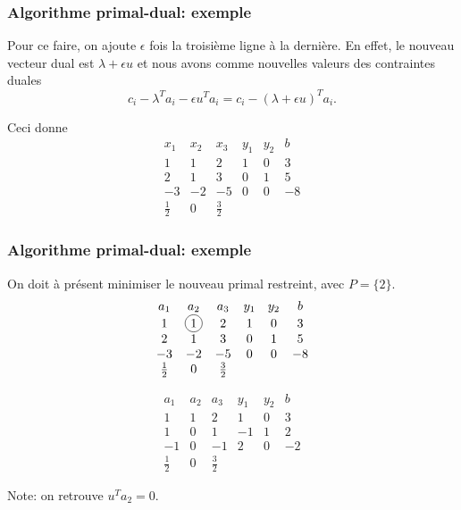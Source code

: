 \documentclass[t,usepdftitle=false]{beamer}
\newcommand*\circled[1]{\tikz[baseline=(char.base)]{
    \node[shape=circle,draw,inner sep=2pt] (char) {#1};}}
\begin{document}
\begin{frame}
\frametitle{Algorithme primal-dual: exemple}

Pour ce faire, on ajoute $\epsilon$ fois la troisième ligne à la dernière.
En effet, le nouveau vecteur dual est $\lambda+\epsilon u$ et nous avons comme nouvelles valeurs des contraintes duales
$$
c_i - \lambda^T a_i - \epsilon u^T a_i = c_i - (\lambda + \epsilon u)^Ta_i. 
$$

\mbox{}

Ceci donne
$$
\begin{matrix}
x_1 & x_2 & x_3 & y_1 & y_2 & b \\
1 & 1 & 2 & 1 & 0 & 3 \\
2 & 1 & 3 & 0 & 1 & 5 \\
-3 & -2 & -5 & 0 & 0 & -8 \\
\frac{1}{2} & 0 & \frac{3}{2}
\end{matrix}
$$

\end{frame}

\begin{frame}
\frametitle{Algorithme primal-dual: exemple}

On doit à présent minimiser le nouveau primal restreint, avec $P = \lbrace 2 \rbrace$.
\[
\begin{matrix}
a_1 & a_2 & a_3 & y_1 & y_2 & b \\
1 & \circled{1} & 2 & 1 & 0 & 3 \\
2 & 1 & 3 & 0 & 1 & 5 \\
-3 & -2 & -5 & 0 & 0 & -8 \\
\frac{1}{2} & 0 & \frac{3}{2}
\end{matrix}
\]

\mbox{}

\[
\begin{matrix}
a_1 & a_2 & a_3 & y_1 & y_2 & b \\
1 & 1 & 2 & 1 & 0 & 3 \\
1 & 0 & 1 & -1 & 1 & 2 \\
-1 & 0 & -1 & 2 & 0 & -2 \\
\frac{1}{2} & 0 & \frac{3}{2}
\end{matrix}
\]

Note: on retrouve $u^T a_2 = 0$.
\end{frame}
\end{document}
